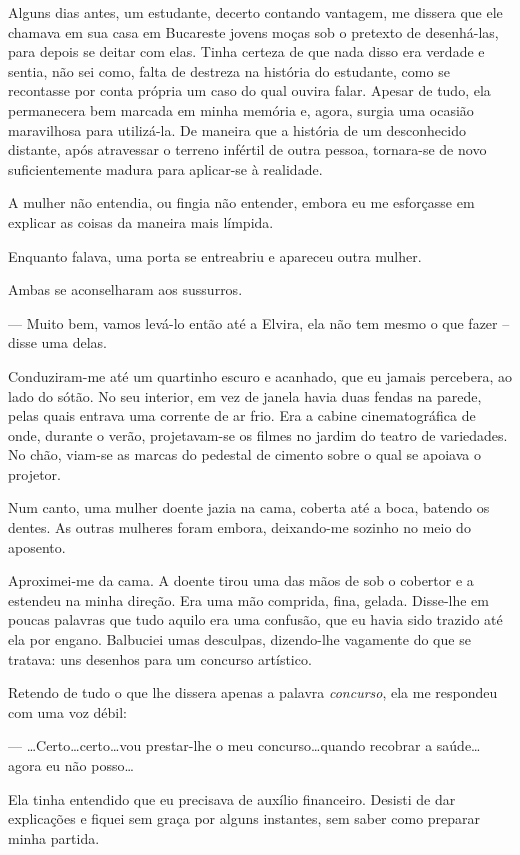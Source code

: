 Alguns dias antes, um estudante, decerto contando vantagem, me dissera que ele chamava em sua casa em Bucareste jovens moças sob o pretexto de desenhá-las, para depois se deitar com elas. Tinha certeza de que nada disso era verdade e sentia, não sei como, falta de destreza na história do estudante, como se recontasse por conta própria um caso do qual ouvira falar. Apesar de tudo, ela permanecera bem marcada em minha memória e, agora, surgia uma ocasião maravilhosa para utilizá-la. De maneira que a história de um desconhecido distante, após atravessar o terreno infértil de outra pessoa, tornara-se de novo suficientemente madura para aplicar-se à realidade.

A mulher não entendia, ou fingia não entender, embora eu me esforçasse em explicar as coisas da maneira mais límpida.

Enquanto falava, uma porta se entreabriu e apareceu outra mulher.

Ambas se aconselharam aos sussurros.

--- Muito bem, vamos levá-lo então até a Elvira, ela não tem mesmo o que fazer -- disse uma delas.

Conduziram-me até um quartinho escuro e acanhado, que eu jamais percebera, ao lado do sótão. No seu interior, em vez de janela havia duas fendas na parede, pelas quais entrava uma corrente de ar frio. Era a cabine cinematográfica de onde, durante o verão, projetavam-se os filmes no jardim do teatro de variedades. No chão, viam-se as marcas do pedestal de cimento sobre o qual se apoiava o projetor.

Num canto, uma mulher doente jazia na cama, coberta até a boca, batendo os dentes. As outras mulheres foram embora, deixando-me sozinho no meio do aposento.

Aproximei-me da cama. A doente tirou uma das mãos de sob o cobertor e a estendeu na minha direção. Era uma mão comprida, fina, gelada. Disse-lhe em poucas palavras que tudo aquilo era uma confusão, que eu havia sido trazido até ela por engano. Balbuciei umas desculpas, dizendo-lhe vagamente do que se tratava: uns desenhos para um concurso artístico.

Retendo de tudo o que lhe dissera apenas a palavra \textit{concurso}, ela me respondeu com uma voz débil:

--- \dots Certo\dots certo\dots vou prestar-lhe o meu concurso\dots quando recobrar a saúde\dots agora eu não posso\dots

Ela tinha entendido que eu precisava de auxílio financeiro. Desisti de dar explicações e fiquei sem graça por alguns instantes, sem saber como preparar minha partida.

